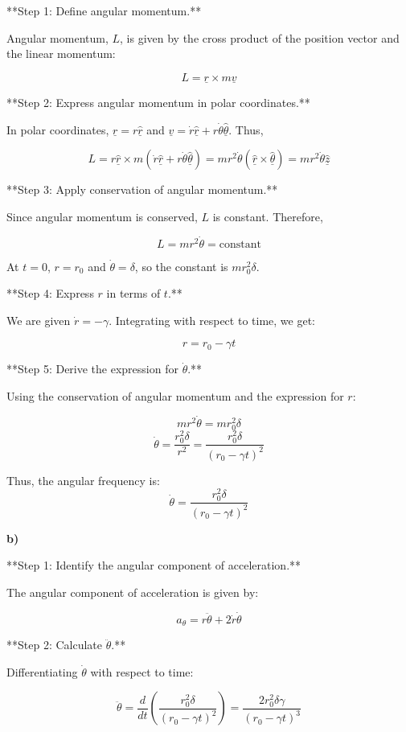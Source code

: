 \documentclass{article}
\begin{document}
**Step 1: Define angular momentum.**

Angular momentum, $L$, is given by the cross product of the position vector and the linear momentum:

\[L = \underline{r} \times m\underline{v}\]

**Step 2: Express angular momentum in polar coordinates.**

In polar coordinates, $\underline{r} = r\underline{\hat{r}}$ and $\underline{v} = \dot{r}\underline{\hat{r}} + r\dot{\theta}\underline{\hat{\theta}}$. Thus,

\[L = r\underline{\hat{r}} \times m(\dot{r}\underline{\hat{r}} + r\dot{\theta}\underline{\hat{\theta}}) = mr^2\dot{\theta}(\underline{\hat{r}} \times \underline{\hat{\theta}}) = mr^2\dot{\theta}\underline{\hat{z}}\]

**Step 3: Apply conservation of angular momentum.**

Since angular momentum is conserved, $L$ is constant. Therefore,

\[L = mr^2\dot{\theta} = \text{constant}\]

At $t=0$, $r=r_0$ and $\dot{\theta}=\delta$, so the constant is $mr_0^2\delta$.

**Step 4: Express $r$ in terms of $t$.**

We are given $\dot{r} = -\gamma$. Integrating with respect to time, we get:

\[r = r_0 - \gamma t\]

**Step 5: Derive the expression for $\dot{\theta}$.**

Using the conservation of angular momentum and the expression for $r$:

\[mr^2\dot{\theta} = mr_0^2\delta\]
\[\dot{\theta} = \frac{r_0^2\delta}{r^2} = \frac{r_0^2\delta}{(r_0 - \gamma t)^2}\]

Thus, the angular frequency is:
\[\dot{\theta} = \frac{r_0^2\delta}{(r_0 - \gamma t)^2}\]

\textbf{b)}

**Step 1: Identify the angular component of acceleration.**

The angular component of acceleration is given by:

\[a_\theta = r\ddot{\theta} + 2\dot{r}\dot{\theta}\]

**Step 2: Calculate $\ddot{\theta}$.**

Differentiating $\dot{\theta}$ with respect to time:

\[\ddot{\theta} = \frac{d}{dt}\left(\frac{r_0^2\delta}{(r_0 - \gamma t)^2}\right) = \frac{2r_0^2\delta\gamma}{(r_0 - \gamma t)^3}\]
\end{document}

